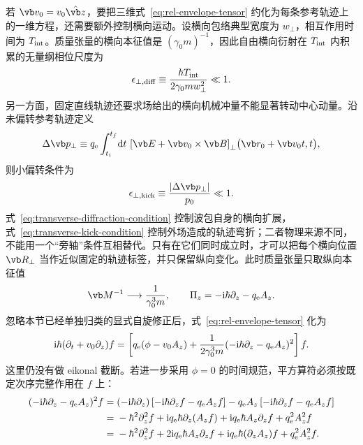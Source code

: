若 $\vb v_0=v_0\hat{\vb z}$，要把三维式~\cref{eq:rel-envelope-tensor} 约化为每条参考轨迹上的一维方程，还需要额外控制横向运动。设横向包络典型宽度为 $w_\perp$，相互作用时间为 $T_{\rm int}$。质量张量的横向本征值是 $(\gamma_0m)^{-1}$，因此自由横向衍射在 $T_{\rm int}$ 内积累的无量纲相位尺度为
\begin{equation}
{
\epsilon_{\perp,{\rm diff}}
\equiv
\frac{\hbar T_{\rm int}}{2\gamma_0m w_\perp^2}
\ll1.}
\label{eq:transverse-diffraction-condition}
\end{equation}
另一方面，固定直线轨迹还要求场给出的横向机械冲量不能显著转动中心动量。沿未偏转参考轨迹定义
\begin{equation}
\Delta\vb p_\perp
\equiv
q_{\rm e}\int_{t_i}^{t_f}\!\dd t\,
\left[
\vb E+\vb v_0\times\vb B
\right]_\perp\!\bigl(\vb r_0+\vb v_0t,t\bigr),
\end{equation}
则小偏转条件为
\begin{equation}
{
\epsilon_{\perp,{\rm kick}}
\equiv\frac{|\Delta\vb p_\perp|}{p_0}\ll1.}
\label{eq:transverse-kick-condition}
\end{equation}
式~\cref{eq:transverse-diffraction-condition} 控制波包自身的横向扩展，式~\cref{eq:transverse-kick-condition} 控制外场造成的轨迹弯折；二者物理来源不同，不能用一个“旁轴”条件互相替代。只有在它们同时成立时，才可以把每个横向位置 $\vb R_\perp$ 当作近似固定的轨迹标签，并只保留纵向变化。此时质量张量只取纵向本征值
\begin{equation}
\vb M^{-1}\longrightarrow\frac{1}{\gamma_0^3m},
\qquad
\Pi_z=-\ii\hbar\partial_z-q_{\rm e}A_z.
\end{equation}
忽略本节已经单独归类的显式自旋修正后，式~\cref{eq:rel-envelope-tensor} 化为
\begin{equation}
{
\mathrm{i}\hbar(\partial_t+v_0\partial_z)f
=\left[
q_{\rm e}(\phi-v_0A_z)
+\frac{1}{2\gamma_0^3m}
(-\mathrm{i}\hbar\partial_z-q_{\rm e}A_z)^2
\right]f.}
\label{eq:rel-envelope-1d-covariant}
\end{equation}
这里仍没有做 eikonal 截断。若进一步采用 $\phi=0$ 的时间规范，平方算符必须按既定次序完整作用在 $f$ 上：
\begin{align}
(-\mathrm{i}\hbar\partial_z-q_{\rm e}A_z)^2f
={}&(-\mathrm{i}\hbar\partial_z)
\left[-\mathrm{i}\hbar\partial_zf-q_{\rm e}A_zf\right]
-q_{\rm e}A_z
\left[-\mathrm{i}\hbar\partial_zf-q_{\rm e}A_zf\right]\\
={}&-\hbar^2\partial_z^2f
+\mathrm{i} q_{\rm e}\hbar\partial_z(A_zf)
+\mathrm{i} q_{\rm e}\hbar A_z\partial_zf
+q_{\rm e}^2A_z^2f\\
={}&-\hbar^2\partial_z^2f
+2\mathrm{i} q_{\rm e}\hbar A_z\partial_zf
+\mathrm{i} q_{\rm e}\hbar(\partial_zA_z)f
+q_{\rm e}^2A_z^2f.
\label{eq:Pi-square-expanded}
\end{align}
